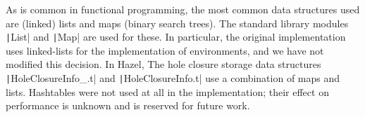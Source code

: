 As is common in functional programming, the most common data structures used are (linked) lists and maps (binary search trees). The standard library modules \texttt|List| and \texttt|Map| are used for these. In particular, the original implementation uses linked-lists for the implementation of environments, and we have not modified this decision. In Hazel, The hole closure storage data structures \texttt|HoleClosureInfo_.t| and \texttt|HoleClosureInfo.t| use a combination of maps and lists. Hashtables were not used at all in the implementation; their effect on performance is unknown and is reserved for future work.


